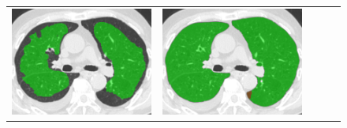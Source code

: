 \begin{figure}[htbp]
\begin{tabular}{ccccc}
\begin{minipage}[c]{.21\textwidth}
      \includegraphics[width=1\textwidth]{images/median/truth/4_0222_20070621_3_180.png}
    \end{minipage} &
    \begin{minipage}[c]{.21\textwidth}
      \centering
      \includegraphics[width=1\textwidth]{images/median/alpha0/4_0222_20070621_3_180.png}
    \end{minipage} &
    \begin{minipage}[c]{.21\textwidth}
      \centering

\end{minipage}
\end{tabular}
\end{figure}
